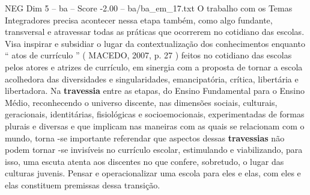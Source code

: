 \begin{textsample}{NEG Dim 5 – ba – Score -2.00 – ba/ba\_em\_17.txt}
O trabalho com os Temas Integradores precisa acontecer nessa etapa também, como algo fundante, transversal e atravessar todas as práticas que ocorrerem no cotidiano das escolas.
Visa inspirar e subsidiar o lugar da contextualização dos conhecimentos enquanto “ atos de currículo ” ( MACEDO, 2007, p. 27 ) feitos no cotidiano das escolas pelos atores e atrizes de currículo, em sinergia com a proposta de tornar a escola acolhedora das diversidades e singularidades, emancipatória, crítica, libertária e libertadora.
Na \textbf{travessia} entre as etapas, do Ensino Fundamental para o Ensino Médio, reconhecendo o universo discente, nas dimensões sociais, culturais, geracionais, identitárias, fisiológicas e socioemocionais, experimentadas de formas plurais e diversas e que implicam nas maneiras com as quais se relacionam com o mundo, torna -se importante referendar que aspectos dessas \textbf{travessias} não podem tornar -se invisíveis no currículo escolar, estimulando e viabilizando, para isso, uma escuta atenta aos discentes no que confere, sobretudo, o lugar das culturas juvenis.
Pensar e operacionalizar uma escola para eles e elas, com eles e elas constituem premissas dessa transição.

\end{textsample}

